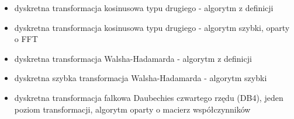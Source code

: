 \documentclass[12pt]{article}
\begin{document}
{\begin{itemize}
                dzielenie ciągu próbek na połowy, ale każdy krok
                rekurencji (każdy podział) wymaga alokacji nowej
                pamięci, współczynniki są wyliczane na bieżąco
            \item dyskretna transformacja kosinusowa typu drugiego -
                algorytm z definicji
            \item dyskretna transformacja kosinusowa typu drugiego -
                algorytm szybki, oparty o FFT
            \item dyskretna transformacja Walsha-Hadamarda - algorytm z
                definicji
            \item dyskretna szybka transformacja Walsha-Hadamarda -
                algorytm szybki
            \item dyskretna transformacja falkowa Daubechies czwartego
                rzędu (DB4), jeden poziom transformacji, algorytm
                oparty o macierz współczynników
        \end{itemize}
    }
    \newpage
\end{document}
